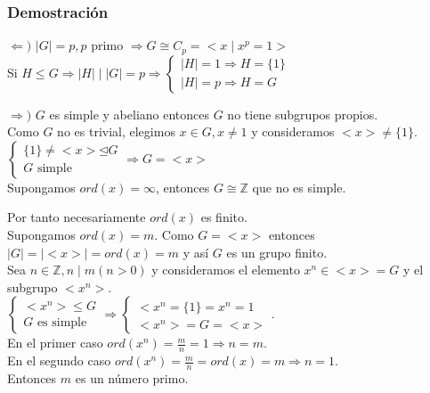 \documentclass[11pt,a4paper]{article}
\begin{document}
\subsubsection*{Demostración}

\begin{enumerate*}
\item[$\Leftarrow)$] $|G| = p, p$ primo $\Rightarrow G \cong C_{p} = <x \mid x^{p} = 1>$ \\
Si $H \leqslant G \Rightarrow |H| \mid |G| = p \Rightarrow
\begin{cases}
|H| = 1 \Rightarrow H = \{1\} \\
|H| = p \Rightarrow H = G
\end{cases}$

\item[$\Rightarrow)$] $G$ es simple y abeliano entonces $G$ no tiene subgrupos propios. \\
Como $G$ no es trivial, elegimos $x \in G, x \neq 1$ y consideramos $<x> \neq \{1\}$. \\
$\begin{cases}
\{1\} \neq <x> \unlhd G \\
G \text{ simple}
\end{cases}
\Rightarrow G = <x>$ \\
Supongamos $ord(x) = \infty$, entonces $G \cong \mathbb{Z}$ que no es simple.

Por tanto necesariamente $ord(x)$ es finito. \\
Supongamos $ord(x) = m$. Como $G = <x>$ entonces $|G| = |<x>| = ord(x) = m$ y así $G$ es un grupo finito. \\
Sea $n \in \mathbb{Z}, n \mid m (n > 0)$ y consideramos el elemento $x^{n} \in <x> = G$ y el subgrupo $<x^{n}>$. \\
$\begin{cases}
<x^{n}> \leq G \\
G \text{ es simple}
\end{cases}
\Rightarrow
\begin{cases}
<x^{n} = \{1\} = x^{n} = 1 \\
<x^{n}> = G = <x>
\end{cases}$. \\
En el primer caso $ord(x^{n}) = \frac{m}{n} = 1 \Rightarrow n = m$. \\
En el segundo caso $ord(x^{n}) = \frac{m}{n} = ord(x) = m \Rightarrow n = 1$. \\
Entonces $m$ es un número primo.
\end{enumerate*}
\end{document}
